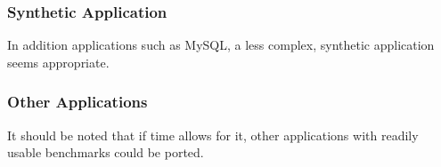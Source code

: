 \documentclass{article}
\begin{document}
\subsubsection{Synthetic Application}

In addition applications such as MySQL, a less complex, synthetic application seems appropriate.

\subsubsection{Other Applications}

It should be noted that if time allows for it, other applications with readily usable benchmarks could be ported.

\clearpage


\end{document}
